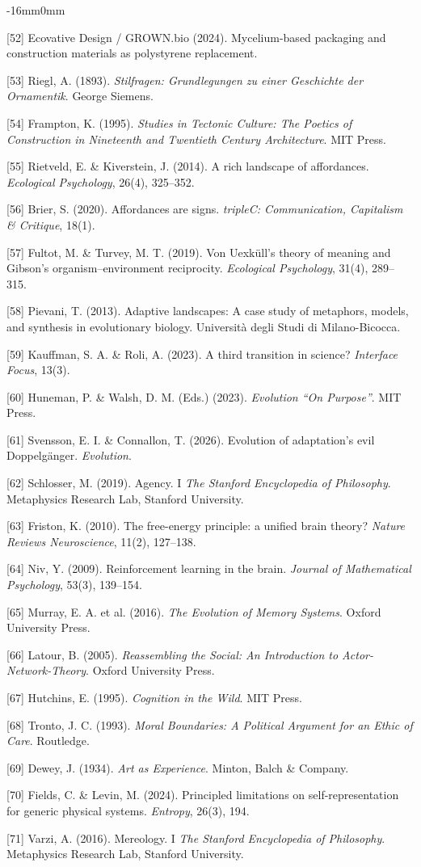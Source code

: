 \documentclass[10pt,oneside]{book}
\newcommand{\refentry}[1]{%
  \par\addvspace{0pt}%
  \begingroup\footnotesize\linespread{0.92}\selectfont
  \noindent\hangindent=4mm\hangafter=1 #1\par%
  \endgroup
}
\newenvironment{widebody}{%
  \begin{adjustwidth}{-16mm}{0mm}%
}{%
  \end{adjustwidth}%
}
\begin{document}
\begin{widebody}
\refentry{[52] Ecovative Design / GROWN.bio (2024). Mycelium-based packaging and construction materials as polystyrene replacement.}
\refentry{[53] Riegl, A. (1893). \textit{Stilfragen: Grundlegungen zu einer Geschichte der Ornamentik}. George Siemens.}
\refentry{[54] Frampton, K. (1995). \textit{Studies in Tectonic Culture: The Poetics of Construction in Nineteenth and Twentieth Century Architecture}. MIT Press.}
\refentry{[55] Rietveld, E. \& Kiverstein, J. (2014). A rich landscape of affordances. \textit{Ecological Psychology}, 26(4), 325--352.}
\refentry{[56] Brier, S. (2020). Affordances are signs. \textit{tripleC: Communication, Capitalism \& Critique}, 18(1).}
\refentry{[57] Fultot, M. \& Turvey, M. T. (2019). Von Uexküll's theory of meaning and Gibson's organism--environment reciprocity. \textit{Ecological Psychology}, 31(4), 289--315.}
\refentry{[58] Pievani, T. (2013). Adaptive landscapes: A case study of metaphors, models, and synthesis in evolutionary biology. Università degli Studi di Milano-Bicocca.}
\refentry{[59] Kauffman, S. A. \& Roli, A. (2023). A third transition in science? \textit{Interface Focus}, 13(3).}
\refentry{[60] Huneman, P. \& Walsh, D. M. (Eds.) (2023). \textit{Evolution ``On Purpose''}. MIT Press.}
\refentry{[61] Svensson, E. I. \& Connallon, T. (2026). Evolution of adaptation's evil Doppelgänger. \textit{Evolution}.}
\refentry{[62] Schlosser, M. (2019). Agency. I \textit{The Stanford Encyclopedia of Philosophy}. Metaphysics Research Lab, Stanford University.}
\refentry{[63] Friston, K. (2010). The free-energy principle: a unified brain theory? \textit{Nature Reviews Neuroscience}, 11(2), 127--138.}
\refentry{[64] Niv, Y. (2009). Reinforcement learning in the brain. \textit{Journal of Mathematical Psychology}, 53(3), 139--154.}
\refentry{[65] Murray, E. A. et al. (2016). \textit{The Evolution of Memory Systems}. Oxford University Press.}
\refentry{[66] Latour, B. (2005). \textit{Reassembling the Social: An Introduction to Actor-Network-Theory}. Oxford University Press.}
\refentry{[67] Hutchins, E. (1995). \textit{Cognition in the Wild}. MIT Press.}
\refentry{[68] Tronto, J. C. (1993). \textit{Moral Boundaries: A Political Argument for an Ethic of Care}. Routledge.}
\refentry{[69] Dewey, J. (1934). \textit{Art as Experience}. Minton, Balch \& Company.}
\refentry{[70] Fields, C. \& Levin, M. (2024). Principled limitations on self-representation for generic physical systems. \textit{Entropy}, 26(3), 194.}
\refentry{[71] Varzi, A. (2016). Mereology. I \textit{The Stanford Encyclopedia of Philosophy}. Metaphysics Research Lab, Stanford University.}

\end{widebody}
\end{document}
